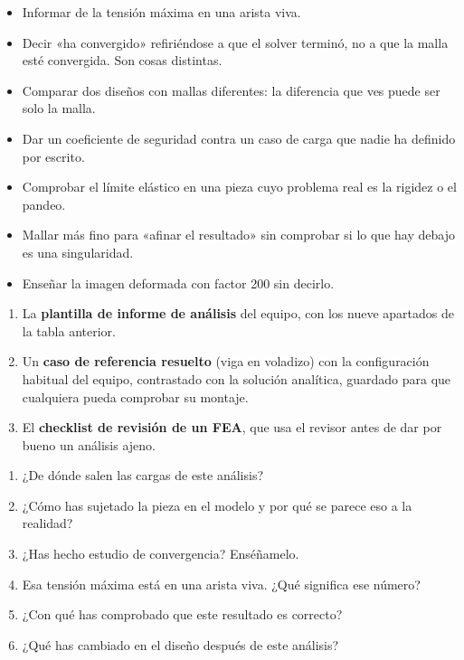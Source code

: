 \begin{ojo}
\begin{itemize}
  \item Informar de la tensión máxima en una arista viva.
  \item Decir «ha convergido» refiriéndose a que el solver terminó, no a que la
        malla esté convergida. Son cosas distintas.
  \item Comparar dos diseños con mallas diferentes: la diferencia que ves puede
        ser solo la malla.
  \item Dar un coeficiente de seguridad contra un caso de carga que nadie ha
        definido por escrito.
  \item Comprobar el límite elástico en una pieza cuyo problema real es la
        rigidez o el pandeo.
  \item Mallar más fino para «afinar el resultado» sin comprobar si lo que hay
        debajo es una singularidad.
  \item Enseñar la imagen deformada con factor \num{200} sin decirlo.
\end{itemize}
\end{ojo}

\begin{entregable}
\begin{enumerate}
  \item La \textbf{plantilla de informe de análisis} del equipo, con los nueve
        apartados de la tabla anterior.
  \item Un \textbf{caso de referencia resuelto} (viga en voladizo) con la
        configuración habitual del equipo, contrastado con la solución analítica,
        guardado para que cualquiera pueda comprobar su montaje.
  \item El \textbf{checklist de revisión de un FEA}, que usa el revisor antes de
        dar por bueno un análisis ajeno.
\end{enumerate}
\end{entregable}

\begin{juez}
\begin{enumerate}
  \item ¿De dónde salen las cargas de este análisis?
  \item ¿Cómo has sujetado la pieza en el modelo y por qué se parece eso a la
        realidad?
  \item ¿Has hecho estudio de convergencia? Enséñamelo.
  \item Esa tensión máxima está en una arista viva. ¿Qué significa ese número?
  \item ¿Con qué has comprobado que este resultado es correcto?
  \item ¿Qué has cambiado en el diseño después de este análisis?
\end{enumerate}
\end{juez}
